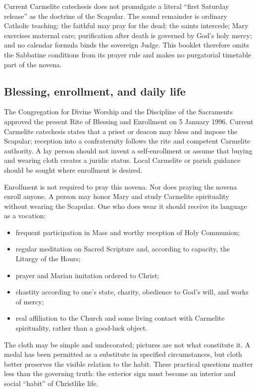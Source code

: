 Current Carmelite catechesis does not promulgate a literal ``first Saturday release'' as the doctrine of the Scapular. The sound remainder is ordinary Catholic teaching: the faithful may pray for the dead; the saints intercede; Mary exercises maternal care; purification after death is governed by God's holy mercy; and no calendar formula binds the sovereign Judge. This booklet therefore omits the Sabbatine conditions from its prayer rule and makes no purgatorial timetable part of the novena.

\subsection{Blessing, enrollment, and daily life}

The Congregation for Divine Worship and the Discipline of the Sacraments approved the present Rite of Blessing and Enrollment on 5 January 1996. Current Carmelite catechesis states that a priest or deacon may bless and impose the Scapular; reception into a confraternity follows the rite and competent Carmelite authority. A lay person should not invent a self-enrollment or assume that buying and wearing cloth creates a juridic status. Local Carmelite or parish guidance should be sought where enrollment is desired.

Enrollment is not required to pray this novena. Nor does praying the novena enroll anyone. A person may honor Mary and study Carmelite spirituality without wearing the Scapular. One who does wear it should receive its language as a vocation:

\begin{itemize}
\item frequent participation in Mass and worthy reception of Holy Communion;
\item regular meditation on Sacred Scripture and, according to capacity, the Liturgy of the Hours;
\item prayer and Marian imitation ordered to Christ;
\item chastity according to one's state, charity, obedience to God's will, and works of mercy;
\item real affiliation to the Church and some living contact with Carmelite spirituality, rather than a good-luck object.
\end{itemize}

The cloth may be simple and undecorated; pictures are not what constitute it. A medal has been permitted as a substitute in specified circumstances, but cloth better preserves the visible relation to the habit. These practical questions matter less than the governing truth: the exterior sign must become an interior and social ``habit'' of Christlike life.

